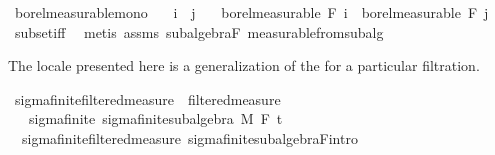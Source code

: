 \begin{isabellebody}
{\isafoldproof}%
%
\isadelimproof
\isanewline
%
\endisadelimproof
\isanewline
{}\isamarkupfalse%
\ borel{\isacharunderscore}{\kern0pt}measurable{\isacharunderscore}{\kern0pt}mono{\isacharcolon}{\kern0pt}\isanewline
\ \ \ {\isachardoublequoteopen}i\ {\isasymle}\ j{\isachardoublequoteclose}\isanewline
\ \ \ {\isachardoublequoteopen}borel{\isacharunderscore}{\kern0pt}measurable\ {\isacharparenleft}{\kern0pt}F\ i{\isacharparenright}{\kern0pt}\ {\isasymsubseteq}\ borel{\isacharunderscore}{\kern0pt}measurable\ {\isacharparenleft}{\kern0pt}F\ j{\isacharparenright}{\kern0pt}{\isachardoublequoteclose}\isanewline
%
\isadelimproof
\ \ %
\endisadelimproof
%
\isatagproof
{}\isamarkupfalse%
\ subset{\isacharunderscore}{\kern0pt}iff\ \isamarkupfalse%
\ {\isacharparenleft}{\kern0pt}metis\ assms\ subalgebra{\isacharunderscore}{\kern0pt}F\ measurable{\isacharunderscore}{\kern0pt}from{\isacharunderscore}{\kern0pt}subalg{\isacharparenright}{\kern0pt}%
\endisatagproof
{\isafoldproof}%
%
\isadelimproof
\isanewline
%
\endisadelimproof
\isanewline
{}\isamarkupfalse%
%
\isadelimdocument
%
\endisadelimdocument
%
\isatagdocument
%
\isamarkuptrue%
%
\endisatagdocument
{\isafolddocument}%
%
\isadelimdocument
%
\endisadelimdocument
%
\begin{isamarkuptext}%
The locale presented here is a generalization of the  for a particular filtration.%
\end{isamarkuptext}\isamarkuptrue%
\isamarkupfalse%
\ sigma{\isacharunderscore}{\kern0pt}finite{\isacharunderscore}{\kern0pt}filtered{\isacharunderscore}{\kern0pt}measure\ {\isacharequal}{\kern0pt}\ filtered{\isacharunderscore}{\kern0pt}measure\ {\isacharplus}{\kern0pt}\isanewline
\ \ \ sigma{\isacharunderscore}{\kern0pt}finite{\isacharcolon}{\kern0pt}\ {\isachardoublequoteopen}sigma{\isacharunderscore}{\kern0pt}finite{\isacharunderscore}{\kern0pt}subalgebra\ M\ {\isacharparenleft}{\kern0pt}F\ t\isanewline
\isanewline
{}\isamarkupfalse%
\ {\isacharparenleft}{\kern0pt}\ sigma{\isacharunderscore}{\kern0pt}finite{\isacharunderscore}{\kern0pt}filtered{\isacharunderscore}{\kern0pt}measure{\isacharparenright}{\kern0pt}\ sigma{\isacharunderscore}{\kern0pt}finite{\isacharunderscore}{\kern0pt}subalgebra{\isacharunderscore}{\kern0pt}F{\isacharbrackleft}{\kern0pt}intro{\isacharbrackright}{\kern0pt}{\isacharcolon}{\kern0pt}\isanewline

\end{isabellebody}
